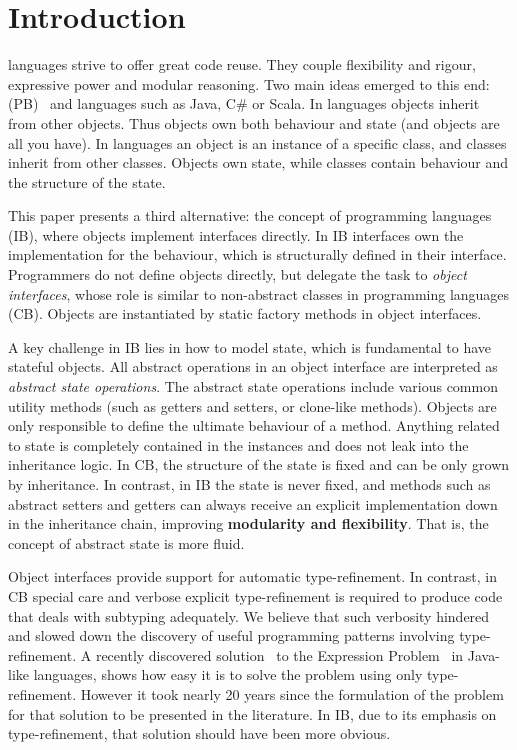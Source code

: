 \section{Introduction}\label{sec:intro}

\Objectoriented languages strive to offer great code reuse.
They couple flexibility and rigour, expressive power and
modular reasoning.  Two main ideas emerged to this end:
\prototypebased (PB)~\cite{Ungar87self} and \classbased languages such as
Java, C\# or Scala.  In \prototypebased
languages objects inherit from other objects. Thus objects own
both behaviour and state (and objects are all you have).
In \classbased languages an object is an instance of a specific class,
and classes inherit from other classes.  Objects own state,
while classes contain behaviour and the structure of the state.

This paper presents a third alternative: the concept of
\emph{\interfacebased} \objectoriented programming languages (IB), where objects
implement interfaces directly. In IB interfaces own the implementation
for the behaviour, which is structurally defined in their
interface. Programmers do not define objects directly, but delegate
the task to \emph{object interfaces}, whose role is similar to non-abstract
classes in \classbased \objectoriented programming languages
(CB). Objects 
are instantiated by static factory methods in object interfaces.

A key challenge in IB lies in how to model state, which is
fundamental to have stateful objects. All abstract operations in an
object interface are interpreted as \emph{abstract state
  operations}. The abstract state operations include various common
utility methods (such as getters and setters, or clone-like
methods). Objects are only responsible to define the ultimate
behaviour of a method. %
Anything related to state is completely contained in the
instances and does not leak into the inheritance logic.  In CB, the structure of the state is fixed and can be only grown
by inheritance.  In contrast, in IB the state is never
fixed, and methods such as abstract setters and getters
can always receive an explicit implementation down in the inheritance
chain, improving \textbf{modularity and flexibility}.  That is, the
concept of abstract state is more fluid.


Object interfaces provide support for automatic type-refinement.  In
contrast, in CB special care and verbose explicit type-refinement is
required to produce code that deals with subtyping adequately. We
believe that such verbosity hindered and slowed down the discovery of
useful programming patterns involving type-refinement. A recently
discovered solution~\cite{eptrivially} to the Expression
Problem~\cite{wadler98expression} in Java-like languages, shows how
easy it is to solve the problem using only type-refinement. However it
took nearly 20 years since the formulation of the problem for that
solution to be presented in the literature. In IB, due to its emphasis
on type-refinement, that solution should have been more obvious.

